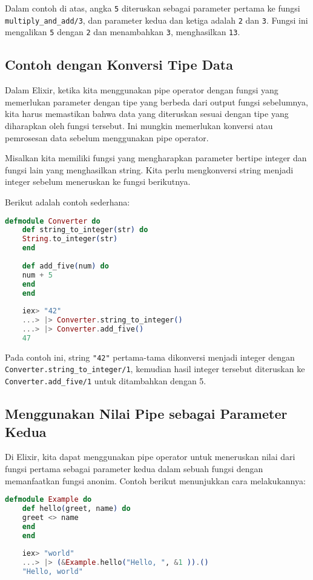 Dalam contoh di atas, angka \texttt{5} diteruskan sebagai parameter pertama ke fungsi \texttt{multiply\_and\_add/3}, dan parameter kedua dan ketiga adalah \texttt{2} dan \texttt{3}. Fungsi ini mengalikan \texttt{5} dengan \texttt{2} dan menambahkan \texttt{3}, menghasilkan \texttt{13}.



\subsection{Contoh dengan Konversi Tipe Data}

Dalam Elixir, ketika kita menggunakan pipe operator dengan fungsi yang memerlukan parameter dengan tipe yang berbeda dari output fungsi sebelumnya, kita harus memastikan bahwa data yang diteruskan sesuai dengan tipe yang diharapkan oleh fungsi tersebut. Ini mungkin memerlukan konversi atau pemrosesan data sebelum menggunakan pipe operator.

Misalkan kita memiliki fungsi yang mengharapkan parameter bertipe integer dan fungsi lain yang menghasilkan string. Kita perlu mengkonversi string menjadi integer sebelum meneruskan ke fungsi berikutnya.

Berikut adalah contoh sederhana:

\begin{lstlisting}[language=Elixir]
	defmodule Converter do
	def string_to_integer(str) do
	String.to_integer(str)
	end
	
	def add_five(num) do
	num + 5
	end
	end
	
	iex> "42"
	...> |> Converter.string_to_integer()
	...> |> Converter.add_five()
	47
\end{lstlisting}

Pada contoh ini, string \texttt{"42"} pertama-tama dikonversi menjadi integer dengan \texttt{Converter.string\_to\_integer/1}, kemudian hasil integer tersebut diteruskan ke \texttt{Converter.add\_five/1} untuk ditambahkan dengan 5.

\subsection{Menggunakan Nilai Pipe sebagai Parameter Kedua}

Di Elixir, kita dapat menggunakan pipe operator untuk meneruskan nilai dari fungsi pertama sebagai parameter kedua dalam sebuah fungsi dengan memanfaatkan fungsi anonim. Contoh berikut menunjukkan cara melakukannya:

\begin{lstlisting}[language=Elixir]
	defmodule Example do
	def hello(greet, name) do
	greet <> name
	end
	end
	
	iex> "world"
	...> |> (&Example.hello("Hello, ", &1 )).()
	"Hello, world"
\end{lstlisting}


